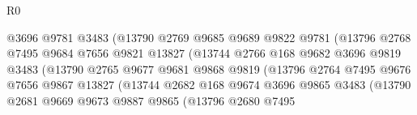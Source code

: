 \begin{lexlean}{R0}
\begin{coremodule}
                                    @3696
                                    @9781
                                    @3483
                                    (@13790
                                      @2769
                                      @9685
                                      @9689
                                      @9822
                                      @9781
                                      (@13796
                                        @2768
                                        @7495
                                        @9684
                                        @7656
                                        @9821
                                        @13827
                                        (@13744
                                          @2766
                                          @168
                                          @9682
                                          @3696
                                          @9819
                                          @3483
                                          (@13790
                                            @2765
                                            @9677
                                            @9681
                                            @9868
                                            @9819
                                            (@13796
                                              @2764
                                              @7495
                                              @9676
                                              @7656
                                              @9867
                                              @13827
                                              (@13744
                                                @2682
                                                @168
                                                @9674
                                                @3696
                                                @9865
                                                @3483
                                                (@13790
                                                  @2681
                                                  @9669
                                                  @9673
                                                  @9887
                                                  @9865
                                                  (@13796
                                                    @2680
                                                    @7495

\end{coremodule}
\end{lexlean}
